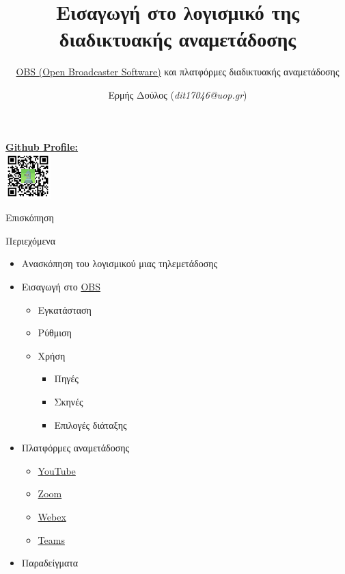 \documentclass[aspectratio=169]{beamer}
\title{Εισαγωγή στο λογισμικό της διαδικτυακής αναμετάδοσης}
\subtitle{\href{https://obsproject.com/}{OBS (Open Broadcaster Software)} και πλατφόρμες διαδικτυακής αναμετάδοσης}
\author{Ερμής Δούλος (\textit{dit17046@uop.gr})}
\begin{document}
\begin{frame}
  \titlepage
  \begin{center}
    \href{https://github.com/doblador42}{\textbf{Github Profile:}}\\
    \includegraphics[width=0.13\textwidth]{images/qrcode.png}
  \end{center}
\end{frame}


\begin{frame}{Επισκόπηση}
  \begin{block}{Περιεχόμενα}
    \begin{itemize}
      \item Ανασκόπηση του λογισμικού μιας τηλεμετάδοσης
      \item Εισαγωγή στο \href{https://obsproject.com/}{OBS}
            \begin{itemize}
              \item Εγκατάσταση
              \item Ρύθμιση
              \item Χρήση
                    \begin{itemize}
                      \item Πηγές
                      \item Σκηνές
                      \item Επιλογές διάταξης
                    \end{itemize}
            \end{itemize}
      \item Πλατφόρμες αναμετάδοσης
            \begin{itemize}
              \item \href{https://www.youtube.com/}{YouTube}
              \item \href{https://zoom.us/}{Zoom}
              \item \href{https://www.webex.com/}{Webex}
              \item \href{https://www.microsoft.com/el-gr/microsoft-teams/group-chat-software}{Teams}
            \end{itemize}
      \item Παραδείγματα
    \end{itemize}
  \end{block}
\end{frame}
\end{document}
